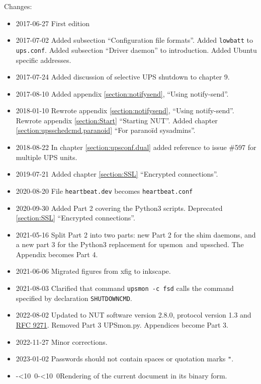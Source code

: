 \documentclass[12pt]{article}
\def\isodate{\leavevmode\hbox{\the\year-\twodigits\month-\twodigits\day}}
\def\twodigits#1{\ifnum#1<10 0\fi\the#1}
\newcommand{\newcolumn}{\vfill\eject}
\newcommand{\upsmon}{\mbox{\textcolor{MONCOLOUR}{upsmon}}}
\newcommand{\upssched}{\mbox{\textcolor{SCHEDCOLOUR}{upssched}}}
\newcommand{\notifysend}{\mbox{\textcolor{NOTIFYCOLOUR}{notify-send}}}
\newcommand{\upsconf}{\textcolor{UPSDCOLOUR}{\texttt{ups.conf}}}
\newcommand{\RFCnumber}{9271}
\newcommand{\RFCshort}{\href{https://www.rfc-editor.org/info/rfc\RFCnumber}%
                            {RFC \RFCnumber}}
\newcommand{\ul}{\begin{itemize}%
   \setlength{\itemsep}{0em}}
\newcommand{\eul}{\end{itemize}}
\newcommand{\li}{\item}                 %
\begin{document}
\vspace*{\fill}
Changes:  

\ul

\li 2017-06-27 First edition 

\li 2017-07-02 Added subsection ``Configuration file formats''.  Added
\texttt{lowbatt} to \upsconf.  Added subsection ``Driver daemon'' to
introduction.  Added Ubuntu specific addresses.

\li 2017-07-24 Added discussion of selective UPS shutdown to chapter 9.

\li 2017-08-10 Added appendix \ref{section:notifysend}, ``Using \notifysend''.

\li 2018-01-10 Rewrote appendix \ref{section:notifysend}, ``Using \notifysend''.
Rewrote appendix \ref{section:Start} ``Starting NUT''.
Added chapter \ref{section:upsschedcmd.paranoid} ``For parano\"id sysadmins''.

\li 2018-08-22 In chapter \ref{section:upsconf.dual} added reference
to issue \#597 for multiple UPS units.

\li 2019-07-21 Added chapter \ref{section:SSL} ``Encrypted connections''.

\li 2020-08-20 File \texttt{heartbeat.dev} becomes \texttt{heartbeat.conf}

\li 2020-09-30 Added Part 2 covering the Python3 scripts. Deprecated
\ref{section:SSL} ``Encrypted connections''.

\li 2021-05-16 Split Part 2 into two parts: new Part 2 for the shim daemons,
and a new part 3 for the Python3 replacement for \upsmon\ and \upssched. The
Appendix becomes Part 4.

\li 2021-06-06 Migrated figures from xfig to inkscape.

\li 2021-08-03 Clarified that command \texttt{upsmon -c fsd} calls the
command specified by declaration \texttt{SHUTDOWNCMD}.

\li 2022-08-02 Updated to NUT software version 2.8.0, protocol version
1.3 and \RFCshort.  Removed Part 3 UPSmon.py.  Appendices become Part 3.

\li 2022-11-27 Minor corrections.

\li 2023-01-02 Passwords should not contain spaces or quotation marks
\texttt{"}.

\li \isodate Rendering of the current document in its binary form.

\eul

\vspace*{\fill}
\newcolumn
\tableofcontents
\listoffigures
\end{document}
